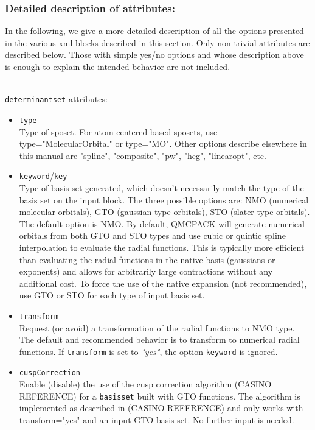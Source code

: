 \subsubsection{Detailed description of attributes:}

In the following, we give a more detailed description of all the options presented in the various xml-blocks described in this section. Only non-trivial attributes are described below. Those with simple yes/no options and whose description above is enough to explain the intended behavior are not included. 

\hspace{1mm} \\

\texttt{determinantset} attributes:

\begin{itemize}
\item \texttt{type} \\
Type of sposet. For atom-centered based sposets, use type="MolecularOrbital" or type="MO". Other options describe elsewhere in this manual are "spline", "composite", "pw", "heg", "linearopt", etc.
\item \texttt{keyword}/\texttt{key} \\
Type of basis set generated, which doesn't necessarily match the type of the basis set on the input block. The three possible options are: NMO (numerical molecular orbitals), GTO (gaussian-type orbitals), STO (slater-type orbitals). The default option is NMO. By default, QMCPACK will generate numerical orbitals from both GTO and STO types and use cubic or quintic spline interpolation to evaluate the radial functions. This is typically more efficient than evaluating the radial functions in the native basis (gaussians or exponents) and allows for arbitrarily large contractions without any additional cost. To force the use of the native expansion (not recommended), use GTO or STO for each type of input basis set.
\item \texttt{transform}\\
Request (or avoid) a transformation of the radial functions to NMO type. The default and recommended behavior is to transform to numerical radial functions. If \texttt{transform} is set to \textit{"yes"}, the option \texttt{keyword} is ignored.  
\item \texttt{cuspCorrection}\\
Enable (disable) the use of the cusp correction algorithm (CASINO REFERENCE) for a \texttt{basisset} built with GTO functions. The algorithm is implemented as described in (CASINO REFERENCE) and only works with transform="yes" and an input GTO basis set. No further input is needed. 
\end{itemize}

